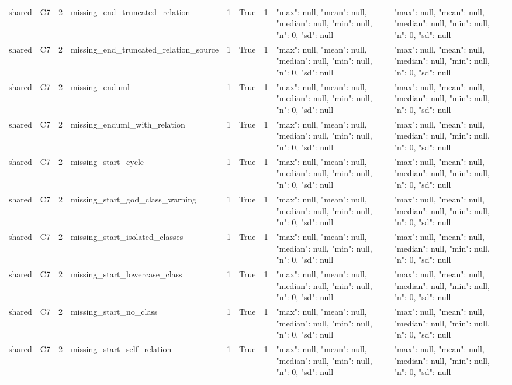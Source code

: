 \begin{tabular}{lllllllll}
shared & C7 & 2 & missing\_end\_truncated\_relation & 1 & True & 1 & {"max": null, "mean": null, "median": null, "min": null, "n": 0, "sd": null} & {"max": null, "mean": null, "median": null, "min": null, "n": 0, "sd": null} \\
shared & C7 & 2 & missing\_end\_truncated\_relation\_source & 1 & True & 1 & {"max": null, "mean": null, "median": null, "min": null, "n": 0, "sd": null} & {"max": null, "mean": null, "median": null, "min": null, "n": 0, "sd": null} \\
shared & C7 & 2 & missing\_enduml & 1 & True & 1 & {"max": null, "mean": null, "median": null, "min": null, "n": 0, "sd": null} & {"max": null, "mean": null, "median": null, "min": null, "n": 0, "sd": null} \\
shared & C7 & 2 & missing\_enduml\_with\_relation & 1 & True & 1 & {"max": null, "mean": null, "median": null, "min": null, "n": 0, "sd": null} & {"max": null, "mean": null, "median": null, "min": null, "n": 0, "sd": null} \\
shared & C7 & 2 & missing\_start\_cycle & 1 & True & 1 & {"max": null, "mean": null, "median": null, "min": null, "n": 0, "sd": null} & {"max": null, "mean": null, "median": null, "min": null, "n": 0, "sd": null} \\
shared & C7 & 2 & missing\_start\_god\_class\_warning & 1 & True & 1 & {"max": null, "mean": null, "median": null, "min": null, "n": 0, "sd": null} & {"max": null, "mean": null, "median": null, "min": null, "n": 0, "sd": null} \\
shared & C7 & 2 & missing\_start\_isolated\_classes & 1 & True & 1 & {"max": null, "mean": null, "median": null, "min": null, "n": 0, "sd": null} & {"max": null, "mean": null, "median": null, "min": null, "n": 0, "sd": null} \\
shared & C7 & 2 & missing\_start\_lowercase\_class & 1 & True & 1 & {"max": null, "mean": null, "median": null, "min": null, "n": 0, "sd": null} & {"max": null, "mean": null, "median": null, "min": null, "n": 0, "sd": null} \\
shared & C7 & 2 & missing\_start\_no\_class & 1 & True & 1 & {"max": null, "mean": null, "median": null, "min": null, "n": 0, "sd": null} & {"max": null, "mean": null, "median": null, "min": null, "n": 0, "sd": null} \\
shared & C7 & 2 & missing\_start\_self\_relation & 1 & True & 1 & {"max": null, "mean": null, "median": null, "min": null, "n": 0, "sd": null} & {"max": null, "mean": null, "median": null, "min": null, "n": 0, "sd": null} \\

\end{tabular}
